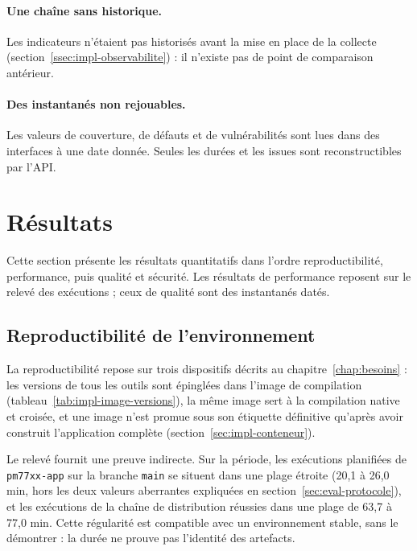 \paragraph{Une chaîne sans historique.} Les indicateurs n'étaient pas historisés
avant la mise en place de la collecte (section~\ref{ssec:impl-observabilite}) :
il n'existe pas de point de comparaison antérieur.

\paragraph{Des instantanés non rejouables.} Les valeurs de couverture, de
défauts et de vulnérabilités sont lues dans des interfaces à une date donnée.
Seules les durées et les issues sont reconstructibles par l'API.

\section{Résultats}
\label{sec:eval-resultats}

Cette section présente les résultats quantitatifs dans l'ordre
reproductibilité, performance, puis qualité et sécurité. Les résultats de
performance reposent sur le relevé des exécutions ; ceux de qualité sont des
instantanés datés.

\subsection{Reproductibilité de l'environnement}
\label{sec:eval-reproductibilite}

La reproductibilité repose sur trois dispositifs décrits au
chapitre~\ref{chap:besoins} : les versions de tous les outils sont épinglées
dans l'image de compilation (tableau~\ref{tab:impl-image-versions}), la même
image sert à la compilation native et croisée, et une image n'est promue sous
son étiquette définitive qu'après avoir construit l'application complète
(section~\ref{sec:impl-conteneur}).

Le relevé fournit une preuve indirecte. Sur la période, les exécutions
planifiées de \texttt{pm77xx-app} sur la branche \texttt{main} se situent dans une
plage étroite (20,1 à 26,0 min, hors les deux valeurs aberrantes
expliquées en section~\ref{sec:eval-protocole}), et les exécutions de la chaîne
de distribution réussies dans une plage de 63,7 à 77,0 min. Cette régularité
est compatible avec un environnement stable, sans le démontrer : la durée ne
prouve pas l'identité des artefacts.

